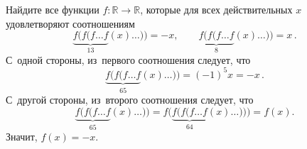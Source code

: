 \problem
Найдите все функции $f \colon \mathbb{R} \to \mathbb{R}$, которые для всех
действительных $x$ удовлетворяют соотношениям
\[
    \underbrace{f(f(f \ldots f}_{13}(x)\ldots)) = -x
,\qquad
    \underbrace{f(f(f\ldots f}_{8}(x)\ldots)) = x
\,.\]
\solution
С~одной стороны, из~первого соотношения следует, что
\[
    \underbrace{f(f(f\ldots f}_{65}(x)\ldots))
=
    (-1)^5 x = -x
\,.\]
С~другой стороны, из~второго соотношения следует, что
\[
    \underbrace{f(f(f\ldots f}_{65}(x)\ldots))
=
    f\bigl(\underbrace{f(f(f\ldots f}_{64}(x)\ldots))\bigr)
=
    f(x)
.\]
Значит, $f(x) = -x$.
\endproblem
